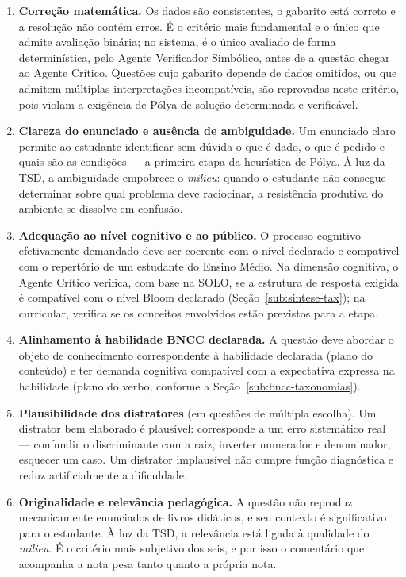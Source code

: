\begin{enumerate}
\item \textbf{Correção matemática.} Os dados são consistentes, o gabarito está correto e a resolução
não contém erros. É o critério mais fundamental e o único que admite avaliação binária; no sistema, é o
único avaliado de forma determinística, pelo Agente Verificador Simbólico, antes de a questão chegar ao
Agente Crítico. Questões cujo gabarito depende de dados omitidos, ou que admitem múltiplas
interpretações incompatíveis, são reprovadas neste critério, pois violam a exigência de Pólya de
solução determinada e verificável.

\item \textbf{Clareza do enunciado e ausência de ambiguidade.} Um enunciado claro permite ao estudante
identificar sem dúvida o que é dado, o que é pedido e quais são as condições --- a primeira etapa da
heurística de Pólya. À luz da TSD, a ambiguidade empobrece o \emph{milieu}: quando o estudante não
consegue determinar sobre qual problema deve raciocinar, a resistência produtiva do ambiente se dissolve
em confusão.

\item \textbf{Adequação ao nível cognitivo e ao público.} O processo cognitivo efetivamente demandado
deve ser coerente com o nível declarado e compatível com o repertório de um estudante do Ensino Médio.
Na dimensão cognitiva, o Agente Crítico verifica, com base na SOLO, se a estrutura de resposta exigida é
compatível com o nível Bloom declarado (Seção~\ref{sub:sintese-tax}); na curricular, verifica se os
conceitos envolvidos estão previstos para a etapa.

\item \textbf{Alinhamento à habilidade BNCC declarada.} A questão deve abordar o objeto de conhecimento
correspondente à habilidade declarada (plano do conteúdo) e ter demanda cognitiva compatível com a
expectativa expressa na habilidade (plano do verbo, conforme a Seção~\ref{sub:bncc-taxonomias}).

\item \textbf{Plausibilidade dos distratores} (em questões de múltipla escolha). Um distrator bem
elaborado é plausível: corresponde a um erro sistemático real --- confundir o discriminante com a raiz,
inverter numerador e denominador, esquecer um caso. Um distrator implausível não cumpre função
diagnóstica e reduz artificialmente a dificuldade.

\item \textbf{Originalidade e relevância pedagógica.} A questão não reproduz mecanicamente enunciados de
livros didáticos, e seu contexto é significativo para o estudante. À luz da TSD, a relevância está
ligada à qualidade do \emph{milieu}. É o critério mais subjetivo dos seis, e por isso o comentário que
acompanha a nota pesa tanto quanto a própria nota.
\end{enumerate}

